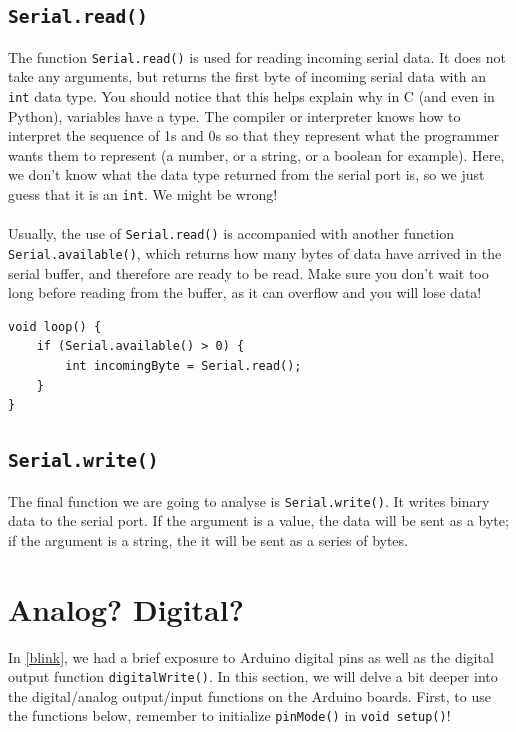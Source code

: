 \documentclass{article}
\begin{document}
\subsection{\texttt{Serial.read()}}
The function \texttt{Serial.read()} is used for reading incoming serial data. It does not take any arguments, but returns the first byte of incoming serial data with an \texttt{int} data type. You should notice that this helps explain why in C (and even in Python), variables have a type. The compiler or interpreter knows how to interpret the sequence of 1s and 0s so that they represent what the programmer wants them to represent (a number, or a string, or a boolean for example). Here, we don't know what the data type returned from the serial port is, so we just guess that it is an \texttt{int}. We might be wrong!\\\\Usually, the use of \texttt{Serial.read()} is accompanied with another function \texttt{Serial.available()}, which returns how many bytes of data have arrived in the serial buffer, and therefore are ready to be read. Make sure you don't wait too long before reading from the buffer, as it can overflow and you will lose data!
\begin{lstlisting}
void loop() {
    if (Serial.available() > 0) {
        int incomingByte = Serial.read();
    }
}
\end{lstlisting}
\vspace{-.8cm}
\subsection{\texttt{Serial.write()}}
The final function we are going to analyse is \texttt{Serial.write()}. It writes binary data to the serial port. If the argument is a value, the data will be sent as a byte; if the argument is a string, the it will be sent as a series of bytes. 




\newpage
\section{Analog? Digital?}
In \autoref{blink}, we had a brief exposure to Arduino digital pins as well as the digital output function \texttt{digitalWrite()}. In this section, we will delve a bit deeper into the digital/analog output/input functions on the Arduino boards. {\color{red} First, to use the functions below, remember to initialize \texttt{pinMode()} in \texttt{void setup()}!} 
\end{document}

